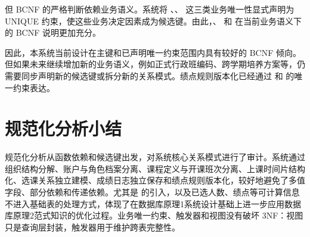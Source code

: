但 BCNF 的严格判断依赖业务语义。系统将 、、 这三类业务唯一性显式声明为 UNIQUE 约束，使这些业务决定因素成为候选键。由此，、 和  在当前业务语义下的 BCNF 说明更加充分。

因此，本系统当前设计在主键和已声明唯一约束范围内具有较好的 BCNF 倾向。但如果未来继续增加新的业务语义，例如正式行政班编码、跨学期培养方案等，仍需要同步声明新的候选键或拆分新的关系模式。绩点规则版本化已经通过  和  的唯一约束表达。

\section{规范化分析小结}

规范化分析从函数依赖和候选键出发，对系统核心关系模式进行了审计。系统通过组织结构分解、账户与角色档案分离、课程定义与开课班次分离、上课时间片结构化、选课关系独立建模、成绩日志独立保存和绩点规则版本化，较好地避免了多值字段、部分依赖和传递依赖。尤其是  的引入，以及已选人数、绩点等可计算信息不进入基础表的处理方式，体现了在数据库原理1系统设计基础上进一步应用数据库原理2范式知识的优化过程。业务唯一约束、触发器和视图没有破坏 3NF：视图只是查询层封装，触发器用于维护跨表完整性。

